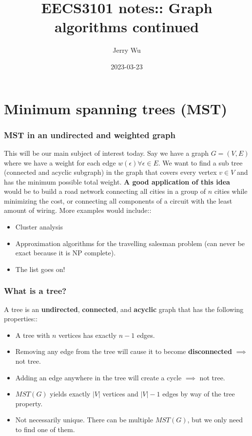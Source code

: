 \documentclass[12pt]{book}
\title{EECS3101 notes:: Graph algorithms continued}
\author{Jerry Wu}
\date{2023-03-23}
\begin{document}
\maketitle
\chapter*{Minimum spanning trees (MST)}

\subsection*{MST in an undirected and weighted graph}
This will be our main subject of interest today. Say we have a graph $G=(V,E)$ where we have a weight for each edge $w(\epsilon)\forall\epsilon\in E$. We want to find a sub tree (connected and acyclic subgraph) in the graph that covers every vertex $v\in V$ and has the minimum possible total weight. \textbf{A good application of this idea} would be to build a road network connecting all cities in a group of $n$ cities while minimizing the cost, or connecting all components of a circuit with the least amount of wiring. More examples would include::

\begin{itemize}
    \item Cluster analysis
    \item Approximation algorithms for the travelling salesman problem (can never be exact because it is NP complete).
    \item The list goes on!
\end{itemize}

\subsection*{What is a tree?}

A tree is an \textbf{undirected}, \textbf{connected}, and \textbf{acyclic} graph that has the following properties::

\begin{itemize}
    \item A tree with $n$ vertices has exactly $n-1$ edges.
    \item Removing any edge from the tree will cause it to become \textbf{disconnected} $\implies$ not tree.
    \item Adding an edge anywhere in the tree will create a cycle $\implies$ not tree.
    \item $MST(G)$ yields exactly $|V|$ vertices and $|V|-1$ edges by way of the tree property.
    \item Not necessarily unique. There can be multiple $MST(G)$, but we only need to find one of them.
\end{itemize}
\end{document}
